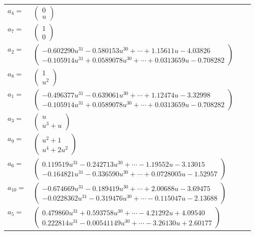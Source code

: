 \documentclass[1p]{elsarticle_modified}
\theoremstyle{definition}
\begin{document}
\begin{tabular}{m{7pt} m{180pt} m{7pt} m{180pt} }
\flushright $a_{4}=$&$\begin{pmatrix}0\\u\end{pmatrix}$ \\
\flushright $a_{7}=$&$\begin{pmatrix}1\\0\end{pmatrix}$ \\
\flushright $a_{2}=$&$\begin{pmatrix}-0.602290 u^{31}-0.580153 u^{30}+\cdots+1.15611 u-4.03826\\-0.105914 u^{31}+0.0589078 u^{30}+\cdots+0.0313659 u-0.708282\end{pmatrix}$ \\
\flushright $a_{8}=$&$\begin{pmatrix}1\\u^2\end{pmatrix}$ \\
\flushright $a_{1}=$&$\begin{pmatrix}-0.496377 u^{31}-0.639061 u^{30}+\cdots+1.12474 u-3.32998\\-0.105914 u^{31}+0.0589078 u^{30}+\cdots+0.0313659 u-0.708282\end{pmatrix}$ \\
\flushright $a_{3}=$&$\begin{pmatrix}u\\u^3+u\end{pmatrix}$ \\
\flushright $a_{9}=$&$\begin{pmatrix}u^2+1\\u^4+2 u^2\end{pmatrix}$ \\
\flushright $a_{6}=$&$\begin{pmatrix}0.119519 u^{31}-0.242713 u^{30}+\cdots-1.19552 u-3.13015\\-0.164821 u^{31}-0.336590 u^{30}+\cdots+0.0728005 u-1.52957\end{pmatrix}$ \\
\flushright $a_{10}=$&$\begin{pmatrix}-0.674669 u^{31}-0.189419 u^{30}+\cdots+2.00688 u-3.69475\\-0.0228362 u^{31}-0.319476 u^{30}+\cdots-0.115047 u-2.13688\end{pmatrix}$ \\
\flushright $a_{5}=$&$\begin{pmatrix}0.479860 u^{31}+0.593758 u^{30}+\cdots-4.21292 u+4.09540\\0.222814 u^{31}-0.00541149 u^{30}+\cdots-3.26130 u+2.60177\end{pmatrix}$ \\

\end{tabular}
\end{document}
